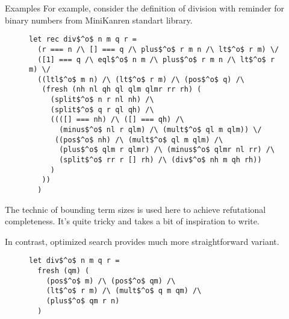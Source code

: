 \documentclass[final]{beamer}
\newlength{\onecolwid}
\begin{document}
\begin{frame}[fragile]
\begin{columns}[t]
\begin{column}{\onecolwid}
\begin{block}{Examples}
For example, consider the definition of division with reminder for binary numbers from MiniKanren standart library.

\begin{figure}
\begin{lstlisting}
let rec div$^o$ n m q r =
  (r === n /\ [] === q /\ plus$^o$ r m n /\ lt$^o$ r m) \/
  ([1] === q /\ eql$^o$ n m /\ plus$^o$ r m n /\ lt$^o$ r m) \/
  ((ltl$^o$ m n) /\ (lt$^o$ r m) /\ (pos$^o$ q) /\
   (fresh (nh nl qh ql qlm qlmr rr rh) (
     (split$^o$ n r nl nh) /\
     (split$^o$ q r ql qh) /\
     ((([] === nh) /\ ([] === qh) /\ 
       (minus$^o$ nl r qlm) /\ (mult$^o$ ql m qlm)) \/
      ((pos$^o$ nh) /\ (mult$^o$ ql m qlm) /\
       (plus$^o$ qlm r qlmr) /\ (minus$^o$ qlmr nl rr) /\
       (split$^o$ rr r [] rh) /\ (div$^o$ nh m qh rh))
     )
   ))
  )
\end{lstlisting}
\end{figure}

The technic of bounding term sizes is used here to achieve refutational completeness. It's quite tricky and takes a bit of inspiration to write.

In contrast, optimized search provides much more straightforward variant.

\begin{figure}
\begin{lstlisting}
let div$^o$ n m q r =
  fresh (qm) (
  	(pos$^o$ m) /\ (pos$^o$ qm) /\
  	(lt$^o$ r m) /\ (mult$^o$ q m qm) /\
  	(plus$^o$ qm r n)
  )
\end{lstlisting}
\end{figure}

\end{block}

\begin{comment}

\begin{block}{Possible solutions}

\begin{enumerate}
  \item Advanced technics of writing relations, such as bounding \\ the sizes of terms
  \item Simulation of commutative conjunction evaluation
  \item \textbf{Reordering of conjuncts during evaluation}
\end{enumerate}

\end{block}



\end{comment}
\end{column}
\end{columns}
\end{frame}
\end{document}
